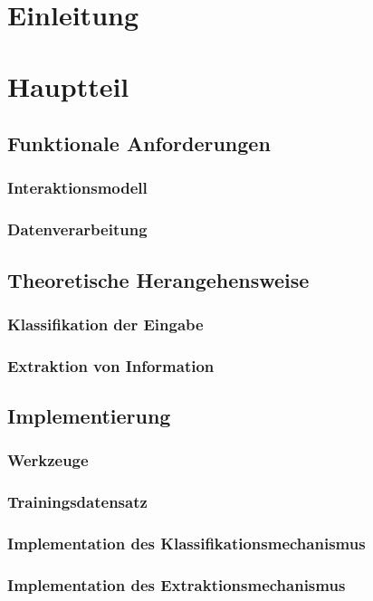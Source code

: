 \chapter{Einleitung}
\chapter{Hauptteil}
\section{Funktionale Anforderungen}
\subsection{Interaktionsmodell}
\subsection{Datenverarbeitung}

\section{Theoretische Herangehensweise}
\subsection{Klassifikation der Eingabe}
\subsection{Extraktion von Information}

\section{Implementierung}
\subsection{Werkzeuge}
\subsection{Trainingsdatensatz}
\subsection{Implementation des Klassifikationsmechanismus}
\subsection{Implementation des Extraktionsmechanismus}
